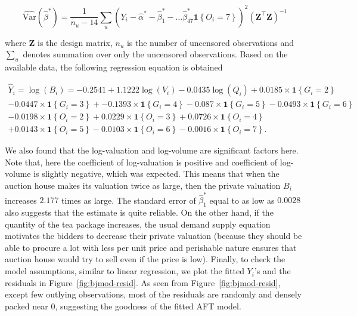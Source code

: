 \documentclass[a4paper,12pt]{article}
\newcommand{\ind}[1]{\boldsymbol{1}\left\{ #1 \right\}}
\begin{document}
$$
\widehat{\text{Var}}(\widehat{\beta}^\ast) = \dfrac{1}{n_u - 14} \sum_u \left( Y_i -  \widehat{\alpha}^{\ast} - \widehat{\beta}_1^{\ast} - \dots \widehat{\beta}_{47}^{\ast} \ind{O_i = 7}\right)^2 (\boldsymbol{Z}^\intercal \boldsymbol{Z})^{-1}
$$

\noindent where $\boldsymbol{Z}$ is the design matrix, $n_u$ is the number of uncensored observations and $\sum_u$ denotes summation over only the uncensored observations. Based on the available data, the following regression equation is obtained

\begin{multline}
\widehat{Y}_i = \log(B_i) = -0.2541 +  1.1222 \log(V_i) - 0.0435\log(Q_i) +
0.0185 \times \ind{G_i = 2}\\
- 0.0447 \times \ind{G_i = 3} + -0.1393 \times \ind{G_i = 4} - 0.087 \times \ind{G_i = 5} - 0.0493\times \ind{G_i = 6}\\
- 0.0198\times \ind{O_i = 2} + 0.0229 \times \ind{O_i = 3} + 0.0726 \times \ind{O_i = 4}\\
+ 0.0143 \times \ind{O_i = 5} - 0.0103 \times \ind{O_i = 6} - 0.0016 \times \ind{O_i = 7}.
\end{multline}

\noindent We also found that the log-valuation and log-volume are significant factors here. Note that, here the coefficient of log-valuation is positive and coefficient of log-volume is slightly negative, which was expected. This means that when the auction house makes its valuation twice as large, then the private valuation $B_i$ increases $2.177$ times as large. The standard error of $\widehat{\beta}_1^\ast$ equal to as low as $0.0028$ also suggests that the estimate is quite reliable. On the other hand, if the quantity of the tea package increases, the usual demand supply equation motivates the bidders to decrease their private valuation (because they should be able to procure a lot with less per unit price and perishable nature ensures that auction house would try to sell even if the price is low). Finally, to check the model assumptions, similar to linear regression, we plot the fitted $Y_i$'s and the residuals in Figure~\ref{fig:bjmod-resid}. As seen from Figure~\ref{fig:bjmod-resid}, except few outlying observations, most of the residuals are randomly and densely packed near $0$, suggesting the goodness of the fitted AFT model.
\end{document}
